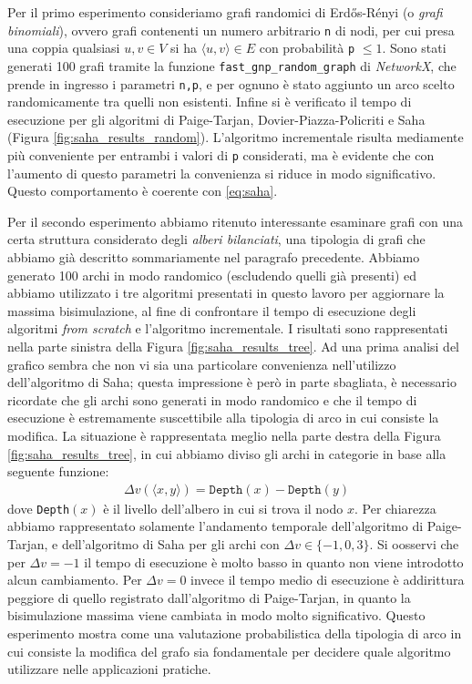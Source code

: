 Per il primo esperimento consideriamo grafi randomici di Erdős-Rényi (o \emph{grafi binomiali}), ovvero grafi contenenti un numero arbitrario \verb|n| di nodi, per cui presa una coppia qualsiasi $u,v \in V$ si ha $\langle u,v\rangle \in E$ con probabilità \verb|p| $\leq 1$. Sono stati generati 100 grafi tramite la funzione \verb|fast_gnp_random_graph| di \emph{NetworkX}, che prende in ingresso i parametri \texttt{n,p}, e per ognuno è stato aggiunto un arco scelto randomicamente tra quelli non esistenti. Infine si è verificato il tempo di esecuzione per gli algoritmi di Paige-Tarjan, Dovier-Piazza-Policriti e Saha (Figura \ref{fig:saha_results_random}). L'algoritmo incrementale risulta mediamente più conveniente per entrambi i valori di \texttt{p} considerati, ma è evidente che con l'aumento di questo parametri la convenienza si riduce in modo significativo. Questo comportamento è coerente con \eqref{eq:saha}.

Per il secondo esperimento abbiamo ritenuto interessante esaminare grafi con una certa struttura considerato degli \emph{alberi bilanciati}, una tipologia di grafi che abbiamo già descritto sommariamente nel paragrafo precedente. Abbiamo generato 100 archi in modo randomico (escludendo quelli già presenti) ed abbiamo utilizzato i tre algoritmi presentati in questo lavoro per aggiornare la massima bisimulazione, al fine di confrontare il tempo di esecuzione degli algoritmi \emph{from scratch} e l'algoritmo incrementale. I risultati sono rappresentati nella parte sinistra della Figura \ref{fig:saha_results_tree}. Ad una prima analisi del grafico sembra che non vi sia una particolare convenienza nell'utilizzo dell'algoritmo di Saha; questa impressione è però in parte sbagliata, è necessario ricordate che gli archi sono generati in modo randomico e che il tempo di esecuzione è estremamente suscettibile alla tipologia di arco in cui consiste la modifica. La situazione è rappresentata meglio nella parte destra della Figura \ref{fig:saha_results_tree}, in cui abbiamo diviso gli archi in categorie in base alla seguente funzione:
\begin{gather*}
    \Delta v(\langle x,y \rangle) = \texttt{Depth}(x) - \texttt{Depth}(y)
\end{gather*}
dove \texttt{Depth}$(x)$ è il livello dell'albero in cui si trova il nodo $x$. Per chiarezza abbiamo rappresentato solamente l'andamento temporale dell'algoritmo di Paige-Tarjan, e dell'algoritmo di Saha per gli archi con $\Delta v \in \{-1,0,3\}$. Si oosservi che per $\Delta v = -1$ il tempo di esecuzione è molto basso in quanto non viene introdotto alcun cambiamento. Per $\Delta v = 0$ invece il tempo medio di esecuzione è addirittura peggiore di quello registrato dall'algoritmo di Paige-Tarjan, in quanto la bisimulazione massima viene cambiata in modo molto significativo. Questo esperimento mostra come una valutazione probabilistica della tipologia di arco in cui consiste la modifica del grafo sia fondamentale per decidere quale algoritmo utilizzare nelle applicazioni pratiche.

